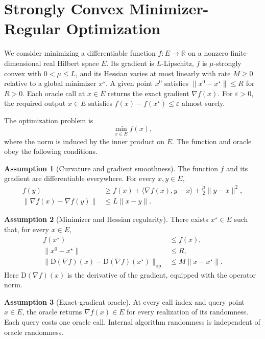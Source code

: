 \documentclass[10pt]{article}
\theoremstyle{definition}
\newtheorem{assumption}{Assumption}
\begin{document}
\section*{Strongly Convex Minimizer-Regular Optimization}
We consider minimizing a differentiable function $f:E\to\mathbb{R}$ on a nonzero finite-dimensional real Hilbert space $E$. Its gradient is $L$-Lipschitz, $f$ is $\mu$-strongly convex with $0<\mu\leq L$, and its Hessian varies at most linearly with rate $M\geq0$ relative to a global minimizer $x^\star$. A given point $x^0$ satisfies $\|x^0-x^\star\|\leq R$ for $R>0$. Each oracle call at $x\in E$ returns the exact gradient $\nabla f(x)$. For $\varepsilon>0$, the required output $\bar{x}\in E$ satisfies $f(\bar{x})-f(x^\star)\leq\varepsilon$ almost surely.

The optimization problem is
\begin{equation*}
\min_{x\in E} f(x),
\end{equation*}
where the norm is induced by the inner product on $E$. The function and oracle obey the following conditions.

\begin{assumption}[Curvature and gradient smoothness]
The function $f$ and its gradient are differentiable everywhere. For every $x,y\in E$,
\begin{align*}
f(y) &\geq f(x)+\langle\nabla f(x),y-x\rangle
       +\frac{\mu}{2}\|y-x\|^2,\\
\|\nabla f(x)-\nabla f(y)\| &\leq L\|x-y\|.
\end{align*}
\end{assumption}

\begin{assumption}[Minimizer and Hessian regularity]
There exists $x^\star\in E$ such that, for every $x\in E$,
\begin{align*}
f(x^\star) &\leq f(x),\\
\|x^0-x^\star\| &\leq R,\\
\|\mathrm{D}(\nabla f)(x)-\mathrm{D}(\nabla f)(x^\star)\|_{\mathrm{op}}
&\leq M\|x-x^\star\|.
\end{align*}
Here $\mathrm{D}(\nabla f)(x)$ is the derivative of the gradient, equipped with the operator norm.
\end{assumption}

\begin{assumption}[Exact-gradient oracle]
At every call index and query point $x\in E$, the oracle returns $\nabla f(x)\in E$ for every realization of its randomness. Each query costs one oracle call. Internal algorithm randomness is independent of oracle randomness.
\end{assumption}
\end{document}
